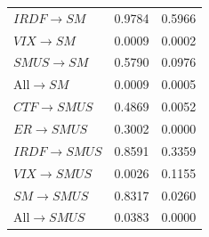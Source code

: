 \documentclass[a4paper, twoside]{templates/ociamthesis}
\begin{document}
\begin{table}[H]
\begin{tabular}[t]{lcc}
$IRDF$$\rightarrow$$SM$ & 0.9784 & 0.5966\\
$VIX$$\rightarrow$$SM$ & 0.0009 & 0.0002\\
$SMUS$$\rightarrow$$SM$ & 0.5790 & 0.0976\\
All$\rightarrow$$SM$ & 0.0009 & 0.0005\\
\addlinespace
$CTF$$\rightarrow$$SMUS$ & 0.4869 & 0.0052\\
$ER$$\rightarrow$$SMUS$ & 0.3002 & 0.0000\\
$IRDF$$\rightarrow$$SMUS$ & 0.8591 & 0.3359\\
$VIX$$\rightarrow$$SMUS$ & 0.0026 & 0.1155\\
$SM$$\rightarrow$$SMUS$ & 0.8317 & 0.0260\\
All$\rightarrow$$SMUS$ & 0.0383 & 0.0000\\
\bottomrule
\end{tabular}
\end{table}
\end{document}
